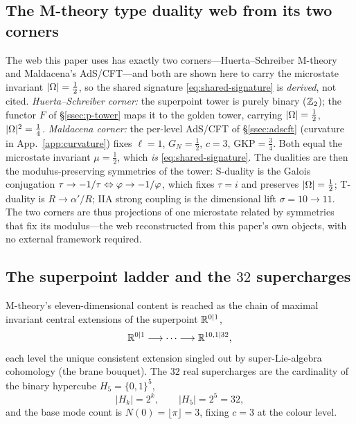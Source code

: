 \subsection{The M-theory type duality web from its two corners}\label{app:web}
The web this paper uses has exactly two corners---Huerta--Schreiber M-theory and Maldacena's AdS/CFT---and both
are shown here to carry the microstate invariant $|\Omega|=\tfrac12$, so the shared signature
\eqref{eq:shared-signature} is \emph{derived}, not cited. \emph{Huerta--Schreiber corner:} the superpoint tower
is purely binary ($\mathbb{Z}_2$); the functor $F$ of \S\ref{ssec:p-tower} maps it to the golden tower, carrying
$|\Omega|=\tfrac12$, $|\Omega|^2=\tfrac14$. \emph{Maldacena corner:} the per-level AdS/CFT of \S\ref{ssec:adscft}
(curvature in App.~\ref{app:curvature}) fixes $\ell=1$, $G_N=\tfrac12$, $c=3$, $\mathrm{GKP}=\tfrac34$. Both
equal the microstate invariant $\mu=\tfrac12$, which \emph{is} \eqref{eq:shared-signature}. The dualities are
then the modulus-preserving symmetries of the tower: S-duality is the Galois conjugation
$\tau\to-1/\tau\Leftrightarrow\varphi\to-1/\varphi$, which fixes $\tau=i$ and preserves $|\Omega|=\tfrac12$;
T-duality is $R\to\alpha'/R$; IIA strong coupling is the dimensional lift $\sigma=10\to11$. The two corners are
thus projections of one microstate related by symmetries that fix its modulus---the web reconstructed from this
paper's own objects, with no external framework required.

\subsection{The superpoint ladder and the $32$ supercharges}\label{app:superpoint}
M-theory's eleven-dimensional content is reached as the chain of maximal invariant central extensions of the
superpoint $\mathbb{R}^{0|1}$,
\begin{equation}
  \mathbb{R}^{0|1}\longrightarrow\cdots\longrightarrow\mathbb{R}^{10,1|32},
\end{equation}
each level the unique consistent extension singled out by super-Lie-algebra cohomology (the brane bouquet). The
$32$ real supercharges are the cardinality of the binary hypercube $H_5=\{0,1\}^5$,
\begin{equation}
  |H_k|=2^{k},\qquad |H_5|=2^{5}=32 ,
\end{equation}
and the base mode count is $N(0)=\lfloor\pi\rfloor=3$, fixing $c=3$ at the colour level.


